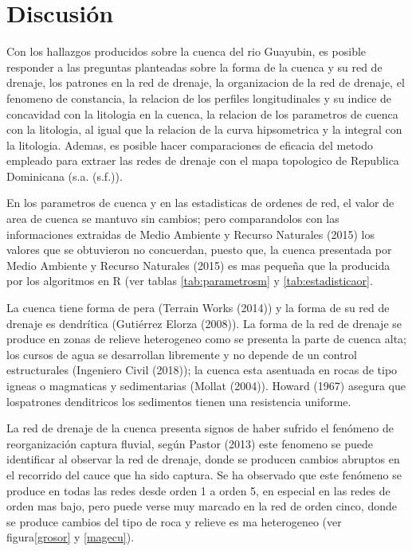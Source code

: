 \documentclass[11pt,]{article}
\begin{document}
\section{Discusión}\label{discusiuxf3n}

Con los hallazgos producidos sobre la cuenca del rio Guayubin, es
posible responder a las preguntas planteadas sobre la forma de la cuenca
y su red de drenaje, los patrones en la red de drenaje, la organizacion
de la red de drenaje, el fenomeno de constancia, la relacion de los
perfiles longitudinales y su indice de concavidad con la litologia en la
cuenca, la relacion de los parametros de cuenca con la litologia, al
igual que la relacion de la curva hipsometrica y la integral con la
litologia. Ademas, es posible hacer comparaciones de eficacia del metodo
empleado para extraer las redes de drenaje con el mapa topologico de
Republica Dominicana (s.a. (s.f.)).

En los parametros de cuenca y en las estadisticas de ordenes de red, el
valor de area de cuenca se mantuvo sin cambios; pero comparandolos con
las informaciones extraidas de Medio Ambiente y Recurso Naturales (2015)
los valores que se obtuvieron no concuerdan, puesto que, la cuenca
presentada por Medio Ambiente y Recurso Naturales (2015) es mas pequeña
que la producida por los algoritmos en R (ver tablas
\ref{tab:parametrosm} y \ref{tab:estadisticaor}.

La cuenca tiene forma de pera (Terrain Works (2014)) y la forma de su
red de drenaje es dendrítica (Gutiérrez Elorza (2008)). La forma de la
red de drenaje se produce en zonas de relieve heterogeneo como se
presenta la parte de cuenca alta; los cursos de agua se desarrollan
libremente y no depende de un control estructurales (Ingeniero Civil
(2018)); la cuenca esta asentuada en rocas de tipo igneas o magmaticas y
sedimentarias (Mollat (2004)). Howard (1967) asegura que lospatrones
denditricos los sedimentos tienen una resistencia uniforme.

La red de drenaje de la cuenca presenta signos de haber sufrido el
fenómeno de reorganización captura fluvial, según Pastor (2013) este
fenomeno se puede identificar al observar la red de drenaje, donde se
producen cambios abruptos en el recorrido del cauce que ha sido captura.
Se ha observado que este fenómeno se produce en todas las redes desde
orden 1 a orden 5, en especial en las redes de orden mas bajo, pero
puede verse muy marcado en la red de orden cinco, donde se produce
cambios del tipo de roca y relieve es ma heterogeneo (ver
figura\ref{grosor} y \ref{magecu}).
\end{document}
